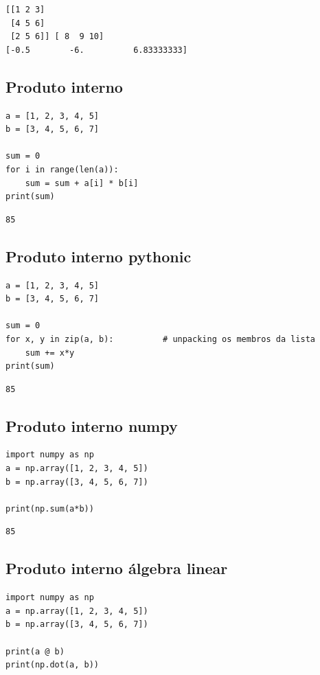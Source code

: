 \documentclass[presentation]{beamer}
\begin{document}
\begin{verbatim}
[[1 2 3]
 [4 5 6]
 [2 5 6]] [ 8  9 10]
[-0.5        -6.          6.83333333]
\end{verbatim}
\subsection{Produto interno}
\label{sec:orgheadline14}

\begin{verbatim}
a = [1, 2, 3, 4, 5]
b = [3, 4, 5, 6, 7]

sum = 0
for i in range(len(a)):
    sum = sum + a[i] * b[i]
print(sum)
\end{verbatim}

\begin{verbatim}
85
\end{verbatim}
\subsection{Produto interno pythonic}
\label{sec:orgheadline15}

\begin{verbatim}
a = [1, 2, 3, 4, 5]
b = [3, 4, 5, 6, 7]

sum = 0
for x, y in zip(a, b):          # unpacking os membros da lista
    sum += x*y
print(sum)
\end{verbatim}

\begin{verbatim}
85
\end{verbatim}
\subsection{Produto interno numpy}
\label{sec:orgheadline16}

\begin{verbatim}
import numpy as np
a = np.array([1, 2, 3, 4, 5])
b = np.array([3, 4, 5, 6, 7])

print(np.sum(a*b))
\end{verbatim}

\begin{verbatim}
85
\end{verbatim}
\subsection{Produto interno álgebra linear}
\label{sec:orgheadline17}

\begin{verbatim}
import numpy as np
a = np.array([1, 2, 3, 4, 5])
b = np.array([3, 4, 5, 6, 7])

print(a @ b)
print(np.dot(a, b))
\end{verbatim}
\end{document}
